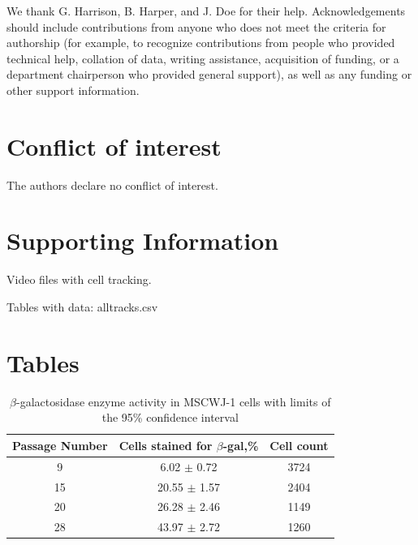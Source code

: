 \documentclass[alpha-refs]{wiley-article}
\begin{document}
We thank G. Harrison, B. Harper, and J. Doe for their help.
Acknowledgements should include contributions from anyone who does not meet the criteria for authorship (for example, to recognize contributions from people who provided technical help, collation of data, writing assistance, acquisition of funding, or a department chairperson who provided general support), as well as any funding or other support information.

\section*{Conflict of interest}
The authors declare no conflict of interest.





\section*{Supporting Information}

Video files with cell tracking.

Tables with data:
alltracks.csv

\section*{Tables}

\begin{table}[hbt!]
  \caption{$\beta$-galactosidase enzyme activity in MSCWJ-1 cells with limits of the 95\% confidence interval}
  \label{tab}
\centering
\begin{tabular}{c|c|c}
 Passage Number & Cells stained for $\beta$-gal,\% & Cell count  \\
 \hline
 9 & 6.02 $\pm$ 0.72 & 3724 \\
 15 & 20.55 $\pm$ 1.57 & 2404 \\
 20 & 26.28 $\pm$ 2.46 & 1149  \\
 28 & 43.97 $\pm$ 2.72 & 1260
\end{tabular}
\end{table}
\end{document}
